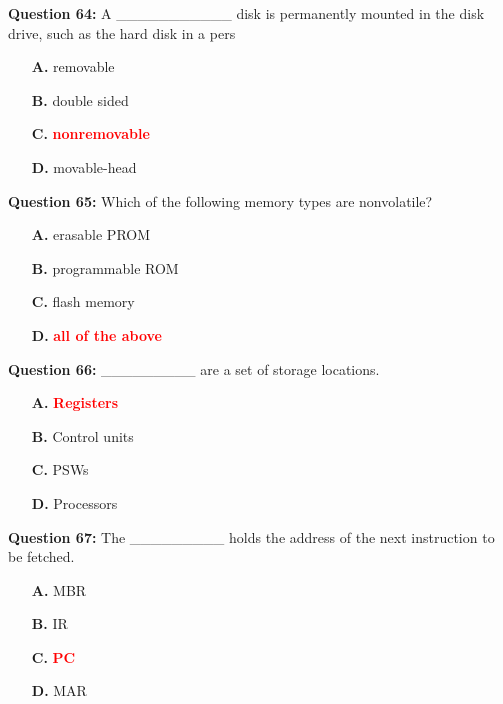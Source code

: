 \documentclass[12pt,a4paper]{article}
\begin{document}
\textbf{Question 64:} A ___________ disk is permanently mounted in the disk drive, such as the hard disk in a pers

\begin{itemize}
    \item[\textbf{A.}] removable
    \item[\textbf{B.}] double sided
    \item[\textbf{C.}] \textcolor{red}{\textbf{nonremovable}}
    \item[\textbf{D.}] movable-head
\end{itemize}

\vspace{0.5cm}

\textbf{Question 65:} Which of the following memory types are nonvolatile?

\begin{itemize}
    \item[\textbf{A.}] erasable PROM
    \item[\textbf{B.}] programmable ROM
    \item[\textbf{C.}] flash memory
    \item[\textbf{D.}] \textcolor{red}{\textbf{all of the above}}
\end{itemize}

\vspace{0.5cm}

\textbf{Question 66:} _________ are a set of storage locations.

\begin{itemize}
    \item[\textbf{A.}] \textcolor{red}{\textbf{Registers}}
    \item[\textbf{B.}] Control units
    \item[\textbf{C.}] PSWs
    \item[\textbf{D.}] Processors
\end{itemize}

\vspace{0.5cm}

\textbf{Question 67:} The _________ holds the address of the next instruction to be fetched.

\begin{itemize}
    \item[\textbf{A.}] MBR
    \item[\textbf{B.}] IR
    \item[\textbf{C.}] \textcolor{red}{\textbf{PC}}
    \item[\textbf{D.}] MAR
\end{itemize}
\end{document}
